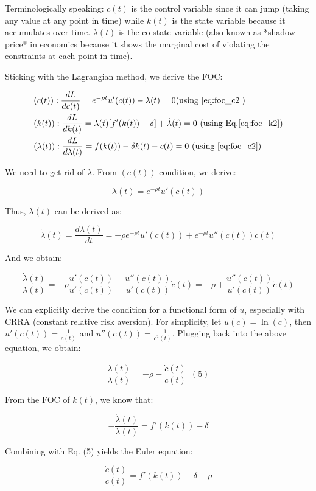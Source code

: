 \documentclass[11pt,a4paper]{book}
\theoremstyle{definition}\newtheorem{definition}{Definition}
\theoremstyle{definition}\newtheorem{fact}{Fact}
\theoremstyle{definition}\newtheorem{remark}{Remark}
\theoremstyle{definition}\newtheorem{ex}{Ex.}
\theoremstyle{definition}\newtheorem{project}{Project}
\theoremstyle{definition}\newtheorem{problem}{Problem}
\theoremstyle{definition}\newtheorem{example}{Example}
\numberwithin{theorem}{section}
\numberwithin{corollary}{chapter}
\numberwithin{assumption}{chapter}
\numberwithin{definition}{chapter}
\numberwithin{prop}{chapter}
\numberwithin{notation}{chapter}
\numberwithin{problem}{chapter}
\numberwithin{example}{chapter}
\numberwithin{fact}{chapter}
\numberwithin{ex}{chapter}
\begin{document}
Terminologically speaking: $c(t)$ is the control variable since it can jump (taking any value at any point in time) while $k(t)$ is the state variable because it accumulates over time. ${\lambda}(t)$ is the co-state variable (also known as *shadow price* in economics because it shows the marginal cost of violating the constraints at each point in time). 

Sticking with the Lagrangian method, we derive the FOC:

\begin{align}
     &(c(t)): \frac{dL}{d c(t)} = e^{-\rho t} u'(c(t)) - \lambda(t) = 0  \text{(using \eqref{eq:foc_c2})}     \\   
     &(k(t)): \frac{dL}{d k(t)} = \lambda(t) [ f'(k(t)) - \delta] + \dot{\lambda}(t) = 0 \ \text{(using Eq.\eqref{eq:foc_k2})} \\
     &(\lambda(t)): \frac{dL}{d \lambda(t)} = f(k(t)) - \delta k(t) - c(t) = 0 \ \text{(using \eqref{eq:foc_c2})}           
\end{align}

We need to get rid of $\lambda$. From $(c(t))$ condition, we derive:

$$
    \lambda(t) = e^{-\rho t} u'(c(t))
$$

Thus, $\dot{\lambda}(t)$ can be derived as:

$$
    \dot{\lambda}(t) = \frac{d \lambda(t)}{dt} = -\rho e^{-\rho t} u'(c(t)) + e^{-\rho t} u''(c(t)) \dot{c}(t)
$$

And we obtain:

$$
    \frac{\dot{\lambda}(t)}{\lambda(t)} = -\rho \frac{u'(c(t))}{u'(c(t))} + \frac{u''(c(t))}{u'(c(t))}\dot{c}(t) = - \rho + \frac{u''(c(t))}{u'(c(t))}\dot{c}(t)
$$

We can explicitly derive the condition for a functional form of $u$, especially with CRRA (constant relative risk aversion). For simplicity, let $u(c) = \ln(c)$, then $u'(c(t)) = \frac{1}{c(t)}$ and $u''(c(t)) = \frac{-1}{c^2(t)}$. Plugging back into the above equation, we obtain:

$$
    \frac{\dot{\lambda}(t)}{\lambda(t)} = -\rho - \frac{\dot{c}(t)}{c(t)} \ \ (5)
$$

From the FOC of $k(t)$, we know that:

$$
    - \frac{\dot{\lambda}(t)}{\lambda(t)} = f'(k(t)) - \delta
$$

Combining with Eq. (5) yields the Euler equation:

$$
\frac{\dot{c}(t)}{c(t)} = f'(k(t)) - \delta -\rho
$$
\end{document}
